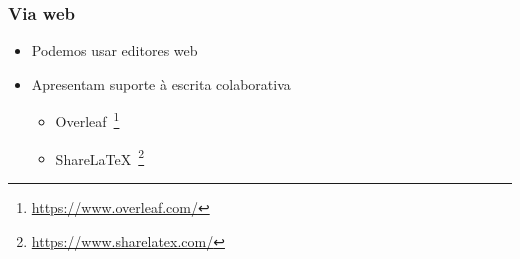 \begin{frame}[fragile] \frametitle{Via web}
\begin{itemize}
	\item Podemos usar editores web
	\item Apresentam suporte à escrita colaborativa
	\begin{itemize}
		\item Overleaf~\footnote{\url{https://www.overleaf.com/}}
		\item ShareLaTeX~\footnote{\url{https://www.sharelatex.com/}}
	\end{itemize}
\end{itemize}
\end{frame}